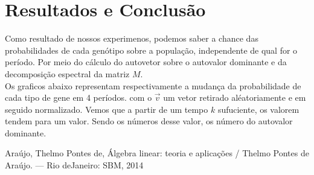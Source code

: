 \documentclass[14pt]{article}
\begin{document}
\section{Resultados e Conclusão}
\label{sec:resultados}

Como resultado de nossos experimenos, podemos saber a chance das probabilidades de cada genótipo sobre a população, independente de qual for o período. Por meio do cálculo do autovetor sobre o autovalor dominante e da decomposição espectral da matriz $M$.\\

Os graficos abaixo representam respectivamente a mudança da probabilidade de cada tipo de gene em 4 períodos. com o $\vec{v}$ um vetor retirado aléatoriamente e em seguido normalizado. Vemos que a partir de um tempo $k$ sufuciente, os valorem tendem para um valor. Sendo os números desse valor, os número do autovalor dominante.
$ $\\





% 

Araújo, Thelmo Pontes de, Álgebra linear: teoria e aplicações / Thelmo Pontes de Araújo. — Rio deJaneiro: SBM, 2014
\end{document}
